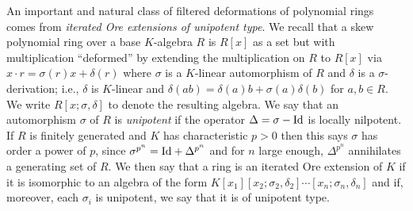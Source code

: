 \documentclass[a4paper,11pt,twoside,notitlepage,reqno]{amsart}
\theoremstyle{plain}
\numberwithin{thm}{section}
\theoremstyle{definition}
\begin{document}
An important and natural class of filtered deformations of polynomial rings comes from \emph{iterated Ore extensions of unipotent type}.  We recall that a skew polynomial ring over a base $K$-algebra $R$ is $R[x]$ as a set but with multiplication ``deformed'' by extending the multiplication on $R$ to $R[x]$ via 
$x\cdot r = \sigma(r) x +\delta(r)$ where $\sigma$ is a $K$-linear automorphism of $R$ and $\delta$ is a $\sigma$-derivation; i.e., $\delta$ is $K$-linear and $\delta(ab)=\delta(a)b+\sigma(a)\delta(b)$ for $a,b\in R$.  We write $R[x;\sigma,\delta]$ to denote the resulting algebra. We say that an automorphism $\sigma$ of $R$ is \emph{unipotent} if the operator $\Delta = \sigma-{\rm Id}$ is locally nilpotent. If $R$ is finitely generated and $K$ has characteristic $p>0$ then this says $\sigma$ has order a power of $p$, since $\sigma^{p^n} = {\rm Id} +\Delta^{p^n}$ and for $n$ large enough, $\Delta^{p^n}$ annihilates a generating set of $R$.  We then say that a ring is an iterated Ore extension of $K$ if it is isomorphic to an algebra of the form $K[x_1][x_2;\sigma_2,\delta_2]\cdots [x_n;\sigma_n,\delta_n]$ and if, moreover, each $\sigma_i$ is unipotent, we say that it is of unipotent type.
\end{document}
